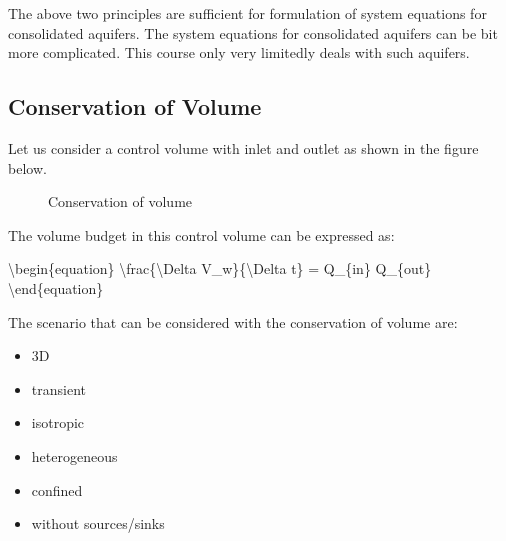 \documentclass[letterpaper,10pt,english]{jupyterBook}
\begin{document}
\sphinxAtStartPar
The above two principles are sufficient for formulation of system equations for consolidated aquifers. The system equations for consolidated aquifers can be bit more complicated. This course only very limitedly deals with such aquifers.


\subsection{Conservation of Volume}
\label{\detokenize{content/flow/L7/17_quantify_flow:conservation-of-volume}}
\sphinxAtStartPar
Let us consider a control volume with inlet and outlet as shown in the figure below.

\begin{figure}[htbp]
\centering
\capstart

\noindent{}
\caption{Conservation of volume}\label{\detokenize{content/flow/L7/17_quantify_flow:vol-bud}}\end{figure}

\sphinxAtStartPar
The volume budget in this control volume can be expressed as:

\sphinxAtStartPar
\textbackslash{}begin\{equation\}
\textbackslash{}frac\{\textbackslash{}Delta V\_w\}\{\textbackslash{}Delta t\} = Q\_\{in\} \sphinxhyphen{} Q\_\{out\}
\textbackslash{}end\{equation\}

\sphinxAtStartPar
The scenario that can be considered with the conservation of volume are:
\begin{itemize}
\item {} 
\sphinxAtStartPar
3D

\item {} 
\sphinxAtStartPar
transient

\item {} 
\sphinxAtStartPar
isotropic

\item {} 
\sphinxAtStartPar
heterogeneous

\item {} 
\sphinxAtStartPar
confined

\item {} 
\sphinxAtStartPar
without sources/sinks

\end{itemize}
\end{document}

